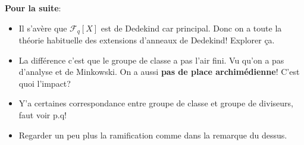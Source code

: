 \documentclass[12pt]{article}
\newcommand{\F}{\mathscr{F}}
\theoremstyle{plain}
\theoremstyle{definition}
\theoremstyle{remark}
\begin{document}
\textbf{Pour la suite}:
\begin{itemize}
    \item Il s'avère que $\F_q[X]$ est de Dedekind car principal. Donc
        on a toute la théorie habituelle des extensions d'anneaux de 
        Dedekind! Explorer ça. 
    \item La différence c'est que le groupe de classe a pas l'air fini.
        Vu qu'on a pas d'analyse et de Minkowski.
        On a aussi \textbf{pas de place archimédienne}! C'est quoi l'impact?
    \item Y'a certaines correspondance entre groupe de classe et groupe
        de diviseurs, faut voir p.q!
    \item Regarder un peu plus la ramification comme dans la remarque du
        dessus.
\end{itemize}
\end{document}
